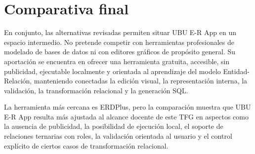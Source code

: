 \section{Comparativa final}

En conjunto, las alternativas revisadas permiten situar UBU E-R App en un espacio intermedio. No pretende competir con herramientas profesionales de modelado de bases de datos ni con editores gráficos de propósito general. Su aportación se encuentra en ofrecer una herramienta gratuita, accesible, sin publicidad, ejecutable localmente y orientada al aprendizaje del modelo Entidad-Relación, manteniendo conectadas la edición visual, la representación interna, la validación, la transformación relacional y la generación SQL.

La herramienta más cercana es ERDPlus, pero la comparación muestra que UBU E-R App resulta más ajustada al alcance docente de este TFG en aspectos como la ausencia de publicidad, la posibilidad de ejecución local, el soporte de relaciones ternarias con roles, la validación orientada al usuario y el control explícito de ciertos casos de transformación relacional.